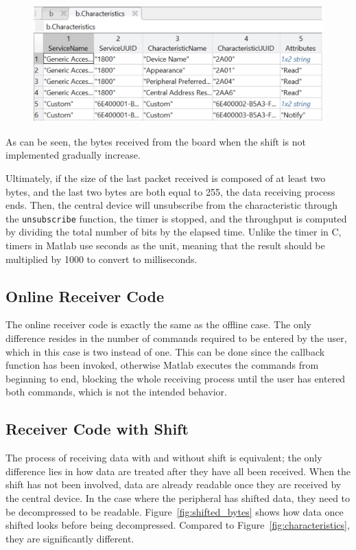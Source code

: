 \documentclass{Configuration_Files/PoliMi3i_thesis}
\begin{document}
\begin{figure}[H]
\centering
\includegraphics[scale=0.7]{Board_Windows_PC/5.png}
\label{fig:received_data}
\end{figure}

As can be seen, the bytes received from the board when the shift is not implemented gradually increase.

Ultimately, if the size of the last packet received is composed of at least two bytes, and the last two bytes are both equal to 255, the data receiving process ends. Then, the central device will unsubscribe from the characteristic through the \texttt{unsubscribe} function, the timer is stopped, and the throughput is computed by dividing the total number of bits by the elapsed time. Unlike the timer in C, timers in Matlab use seconds as the unit, meaning that the result should be multiplied by 1000 to convert to milliseconds.

\subsection{Online Receiver Code}

The online receiver code is exactly the same as the offline case. The only difference resides in the number of commands required to be entered by the user, which in this case is two instead of one. This can be done since the callback function has been invoked, otherwise Matlab executes the commands from beginning to end, blocking the whole receiving process until the user has entered both commands, which is not the intended behavior.

\subsection{Receiver Code with Shift}

The process of receiving data with and without shift is equivalent; the only difference lies in how data are treated after they have all been received. When the shift has not been involved, data are already readable once they are received by the central device. In the case where the peripheral has shifted data, they need to be decompressed to be readable. Figure~\ref{fig:shifted_bytes} shows how data once shifted looks before being decompressed. Compared to Figure~\ref{fig:characteristics}, they are significantly different.
\end{document}
